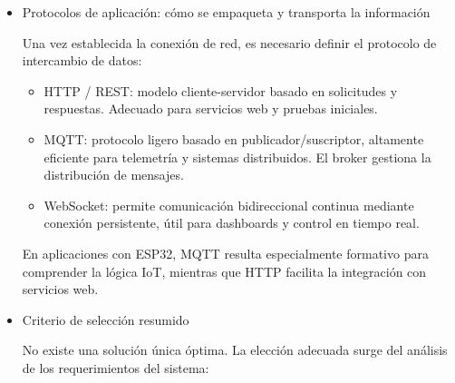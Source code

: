 \begin{itemize}
\begin{itemize}
        \begin{itemize}
            \item Wi-Fi: basado en el estándar 802.11, ideal para transmisión de grandes volúmenes de datos y conexión directa a internet.
            \item Bluetooth / BLE: optimizado para bajo consumo, fundamental en dispositivos portátiles y sensores de batería.
            \item ZigBee: diseñado para redes de sensores distribuidos que operan de forma cooperativa.
            \item Thread: protocolo mallado basado en IPv6, auto-reparable y eficiente energéticamente.
            \item LoRaWAN: orientado a telemetría de largo alcance con bajo consumo y baja frecuencia de transmisión.
            \item Celular / NB-IoT: permite independencia de redes locales, aunque con mayor complejidad operativa.
        \end{itemize}

        \item Protocolos de aplicación: cómo se empaqueta y transporta la información

        Una vez establecida la conexión de red, es necesario definir el protocolo de intercambio de datos:

        \begin{itemize}
            \item HTTP / REST: modelo cliente-servidor basado en solicitudes y respuestas. Adecuado para servicios web y pruebas iniciales.
            \item MQTT: protocolo ligero basado en publicador/suscriptor, altamente eficiente para telemetría y sistemas distribuidos. El broker gestiona la distribución de mensajes.
            \item WebSocket: permite comunicación bidireccional continua mediante conexión persistente, útil para dashboards y control en tiempo real.
        \end{itemize}

        En aplicaciones con ESP32, MQTT resulta especialmente formativo para comprender la lógica IoT, mientras que HTTP facilita la integración con servicios web.

        \item Criterio de selección resumido

        No existe una solución única óptima. La elección adecuada surge del análisis de los requerimientos del sistema:


\end{itemize}
\end{itemize}
